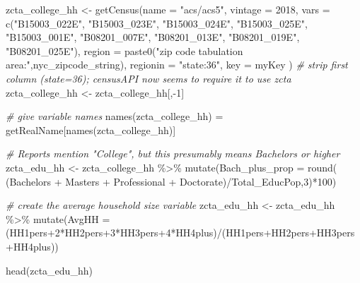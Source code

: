 \documentclass[
  openany]{book}
\newenvironment{Shaded}{\begin{snugshade}}{\end{snugshade}}
\newcommand{\AttributeTok}[1]{\textcolor[rgb]{0.77,0.63,0.00}{#1}}
\newcommand{\CommentTok}[1]{\textcolor[rgb]{0.56,0.35,0.01}{\textit{#1}}}
\newcommand{\DecValTok}[1]{\textcolor[rgb]{0.00,0.00,0.81}{#1}}
\newcommand{\FunctionTok}[1]{\textcolor[rgb]{0.00,0.00,0.00}{#1}}
\newcommand{\NormalTok}[1]{#1}
\newcommand{\OtherTok}[1]{\textcolor[rgb]{0.56,0.35,0.01}{#1}}
\newcommand{\SpecialCharTok}[1]{\textcolor[rgb]{0.00,0.00,0.00}{#1}}
\newcommand{\StringTok}[1]{\textcolor[rgb]{0.31,0.60,0.02}{#1}}
\begin{document}
\begin{Shaded}
\begin{Highlighting}[]
\NormalTok{zcta\_college\_hh }\OtherTok{\textless{}{-}} \FunctionTok{getCensus}\NormalTok{(}\AttributeTok{name =} \StringTok{"acs/acs5"}\NormalTok{,}
                             \AttributeTok{vintage =} \DecValTok{2018}\NormalTok{,}
                             \AttributeTok{vars =} \FunctionTok{c}\NormalTok{(}\StringTok{"B15003\_022E"}\NormalTok{, }\StringTok{"B15003\_023E"}\NormalTok{, }\StringTok{"B15003\_024E"}\NormalTok{, }
                                      \StringTok{"B15003\_025E"}\NormalTok{, }\StringTok{"B15003\_001E"}\NormalTok{,}
                                      \StringTok{"B08201\_007E"}\NormalTok{, }\StringTok{"B08201\_013E"}\NormalTok{, }
                                      \StringTok{"B08201\_019E"}\NormalTok{, }\StringTok{"B08201\_025E"}\NormalTok{),}
                             \AttributeTok{region =} \FunctionTok{paste0}\NormalTok{(}\StringTok{"zip code tabulation area:"}\NormalTok{,nyc\_zipcode\_string),}
                             \AttributeTok{regionin =} \StringTok{"state:36"}\NormalTok{,}
                             \AttributeTok{key =}\NormalTok{ myKey}
\NormalTok{)}
\CommentTok{\# strip first column (state=36); censusAPI now seems to require it to use zcta}
\NormalTok{zcta\_college\_hh }\OtherTok{\textless{}{-}}\NormalTok{ zcta\_college\_hh[,}\SpecialCharTok{{-}}\DecValTok{1}\NormalTok{]}

\CommentTok{\# give variable names}
\FunctionTok{names}\NormalTok{(zcta\_college\_hh) }\OtherTok{=}\NormalTok{ getRealName[}\FunctionTok{names}\NormalTok{(zcta\_college\_hh)]}

\CommentTok{\# Reports mention "College", but this presumably means Bachelors or higher}
\NormalTok{zcta\_edu\_hh }\OtherTok{\textless{}{-}}\NormalTok{ zcta\_college\_hh }\SpecialCharTok{\%\textgreater{}\%} 
                  \FunctionTok{mutate}\NormalTok{(}\AttributeTok{Bach\_plus\_prop =} \FunctionTok{round}\NormalTok{( (Bachelors }\SpecialCharTok{+}\NormalTok{ Masters }\SpecialCharTok{+} 
\NormalTok{                                                    Professional }\SpecialCharTok{+} 
\NormalTok{                                                    Doctorate)}\SpecialCharTok{/}\NormalTok{Total\_EducPop,}\DecValTok{3}\NormalTok{)}\SpecialCharTok{*}\DecValTok{100}\NormalTok{)}

\CommentTok{\# create the average household size variable}
\NormalTok{zcta\_edu\_hh }\OtherTok{\textless{}{-}}\NormalTok{ zcta\_edu\_hh }\SpecialCharTok{\%\textgreater{}\%} 
  \FunctionTok{mutate}\NormalTok{(}\AttributeTok{AvgHH =}\NormalTok{ (HH1pers}\SpecialCharTok{+}\DecValTok{2}\SpecialCharTok{*}\NormalTok{HH2pers}\SpecialCharTok{+}\DecValTok{3}\SpecialCharTok{*}\NormalTok{HH3pers}\SpecialCharTok{+}\DecValTok{4}\SpecialCharTok{*}\NormalTok{HH4plus)}\SpecialCharTok{/}\NormalTok{(HH1pers}\SpecialCharTok{+}\NormalTok{HH2pers}\SpecialCharTok{+}\NormalTok{HH3pers}\SpecialCharTok{+}\NormalTok{HH4plus)) }

\FunctionTok{head}\NormalTok{(zcta\_edu\_hh)}
\end{Highlighting}
\end{Shaded}
\end{document}
